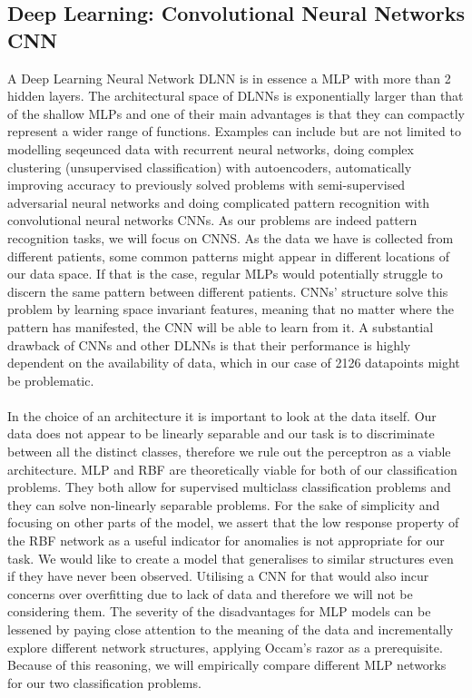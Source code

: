 \documentclass[11pt,a4paper]{article}
\begin{document}
\subsection{Deep Learning: Convolutional Neural Networks CNN}
\label{sec:CNN}
A Deep Learning Neural Network DLNN is in essence a MLP with more than 2 hidden layers. The architectural space of DLNNs is exponentially larger than that of the shallow MLPs and one of their main advantages is that they can compactly represent a wider range of functions. Examples can include but are not limited to modelling seqeunced data with recurrent neural networks, doing complex clustering (unsupervised classification) with autoencoders, automatically improving accuracy to previously solved problems with semi-supervised adversarial neural networks and doing complicated pattern recognition with convolutional neural networks CNNs. As our problems are indeed pattern recognition tasks, we will focus on CNNS. As the data we have is collected from different patients, some common patterns might appear in different locations of our data space. If that is the case, regular MLPs would potentially struggle to discern the same pattern between different patients. CNNs' structure solve this problem by learning space invariant features, meaning that no matter where the pattern has manifested, the CNN will be able to learn from it. A substantial drawback of CNNs and other DLNNs is that their performance is highly dependent on the availability of data, which in our case of 2126 datapoints might be problematic.

\paragraph{}
In the choice of an architecture it is important to look at the data itself. Our data does not appear to be linearly separable and our task is to discriminate between all the distinct classes, therefore we rule out the perceptron as a viable architecture.
MLP and RBF are theoretically viable for both of our classification problems. They both allow for supervised multiclass classification problems and they can solve non-linearly separable problems. For the sake of simplicity and focusing on other parts of the model, we assert that the low response property of the RBF network as a useful indicator for anomalies is not appropriate for our task. We would like to create a model that generalises to similar structures even if they have never been observed. Utilising a CNN for that would also incur concerns over overfitting due to lack of data and therefore we will not be considering them.
The severity of the disadvantages for MLP models can be lessened by paying close attention to the meaning of the data and incrementally explore different network structures, applying Occam's razor as a prerequisite. Because of this reasoning, we will empirically compare different MLP networks for our two classification problems.
\end{document}
